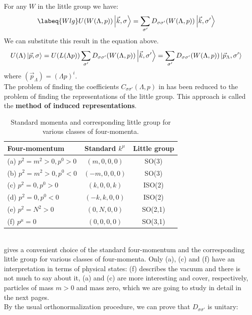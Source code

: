 \documentclass[../main.tex]{subfiles}
\begin{document}
For any $W$ in the little group we have:
\begin{equation}
\labeq{Wlg}
U(W(\Lambda,p))\ket{\vec{k},\sigma}=\sum_{\sigma'}D_{\sigma\sigma'}(W(\Lambda,p))\ket{\vec{k},\sigma'}
\end{equation}
We can substitute this result in the equation above.
\[
U(\Lambda)\ket{\vec{p},\sigma}=U(L(\Lambda p))\sum_{\sigma'}D_{\sigma\sigma'}(W(\Lambda,p))\ket{\vec{k},\sigma'}=\sum_{\sigma'}D_{\sigma\sigma'}(W(\Lambda,p))\ket{\vec{p}_\Lambda,\sigma'}
\]
where $(\vec{p}_\Lambda)=(\Lambda p)^i$.\\
The problem of finding the coefficients $C_{\sigma\sigma'}(\Lambda,p)$ in  has been reduced to the problem of finding the representations of the little group. This approach is called the \textbf{method of induced representations}. 
\begin{table}[h]
    \centering
    \begin{tabular}{lcc}
    \hline
    Four-momentum & Standard $k^\mu$ & Little group \\
    \hline\hline 
    (a) $p^2=m^2>0,p^0>0$ & $(m,0,0,0)$ & SO(3)\\
    (b) $p^2=m^2>0,p^0<0$ & $(-m,0,0,0)$ & SO(3)\\
    (c) $p^2=0,p^0>0$ & $(k,0,0,k)$ & ISO(2)\\
    (d) $p^2=0,p^0<0$ & $(-k,k,0,0)$ & ISO(2)\\
    (e) $p^2=N^2>0$ & $(0,N,0,0)$ & SO(2,1)\\
    (f) $p^\mu=0$ & $(0,0,0,0)$ & SO(3,1)\\
    \hline
    \end{tabular}
    \caption{Standard momenta and corresponding little group for various classes of four-momenta.}
\end{table}\\
 gives a convenient choice of the standard four-momentum and the corresponding little group for various classes of four-momenta. Only (a), (c) and (f) have an interpretation in terms of physical states: (f) describes the vacuum and there is not much to say about it, (a) and (c) are more interesting and cover, respectively, particles of mass $m>0$ and mass zero, which we are going to study in detail in the next pages.\\
By the usual orthonormalization procedure, we can prove that $D_{\sigma\sigma'}$ is unitary:
\end{document}
